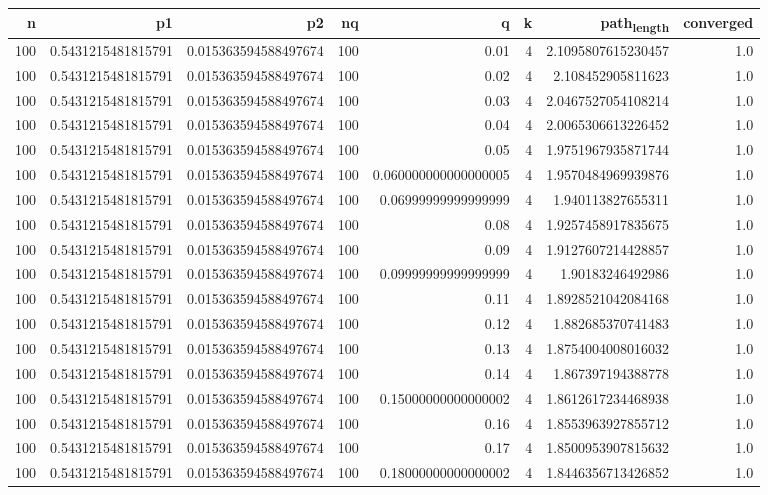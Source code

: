 \documentclass[11pt]{article}
\begin{document}
\begin{center}
\begin{tabular}{rrrrrrrr}
\hline
n & p1 & p2 & nq & q & k & path\textsubscript{length} & converged\\
\hline
100 & 0.5431215481815791 & 0.015363594588497674 & 100 & 0.01 & 4 & 2.1095807615230457 & 1.0\\
100 & 0.5431215481815791 & 0.015363594588497674 & 100 & 0.02 & 4 & 2.108452905811623 & 1.0\\
100 & 0.5431215481815791 & 0.015363594588497674 & 100 & 0.03 & 4 & 2.0467527054108214 & 1.0\\
100 & 0.5431215481815791 & 0.015363594588497674 & 100 & 0.04 & 4 & 2.0065306613226452 & 1.0\\
100 & 0.5431215481815791 & 0.015363594588497674 & 100 & 0.05 & 4 & 1.9751967935871744 & 1.0\\
100 & 0.5431215481815791 & 0.015363594588497674 & 100 & 0.060000000000000005 & 4 & 1.9570484969939876 & 1.0\\
100 & 0.5431215481815791 & 0.015363594588497674 & 100 & 0.06999999999999999 & 4 & 1.940113827655311 & 1.0\\
100 & 0.5431215481815791 & 0.015363594588497674 & 100 & 0.08 & 4 & 1.9257458917835675 & 1.0\\
100 & 0.5431215481815791 & 0.015363594588497674 & 100 & 0.09 & 4 & 1.9127607214428857 & 1.0\\
100 & 0.5431215481815791 & 0.015363594588497674 & 100 & 0.09999999999999999 & 4 & 1.90183246492986 & 1.0\\
100 & 0.5431215481815791 & 0.015363594588497674 & 100 & 0.11 & 4 & 1.8928521042084168 & 1.0\\
100 & 0.5431215481815791 & 0.015363594588497674 & 100 & 0.12 & 4 & 1.882685370741483 & 1.0\\
100 & 0.5431215481815791 & 0.015363594588497674 & 100 & 0.13 & 4 & 1.8754004008016032 & 1.0\\
100 & 0.5431215481815791 & 0.015363594588497674 & 100 & 0.14 & 4 & 1.867397194388778 & 1.0\\
100 & 0.5431215481815791 & 0.015363594588497674 & 100 & 0.15000000000000002 & 4 & 1.8612617234468938 & 1.0\\
100 & 0.5431215481815791 & 0.015363594588497674 & 100 & 0.16 & 4 & 1.8553963927855712 & 1.0\\
100 & 0.5431215481815791 & 0.015363594588497674 & 100 & 0.17 & 4 & 1.8500953907815632 & 1.0\\
100 & 0.5431215481815791 & 0.015363594588497674 & 100 & 0.18000000000000002 & 4 & 1.8446356713426852 & 1.0\\

\end{tabular}
\end{center}
\end{document}
